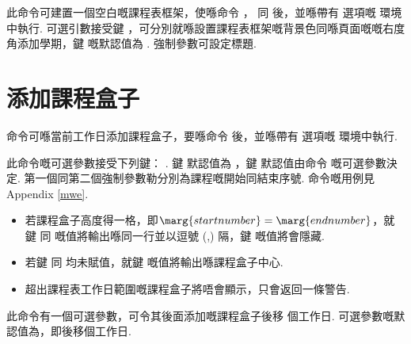 \documentclass[letterpaper]{l3doc}
\begin{document}
\begin{function}{\maketable}
  \begin{syntax}
  \end{syntax}

  此命令可建置一個空白嘅課程表框架，使喺命令 ， 同  後，並喺帶有  選項嘅  環境中執行. 可選引數接受鍵  ，可分別就喺設置課程表框架嘅背景色同喺頁面嘅嘅右度角添加學期，鍵  嘅默認值為 . 強制參數可設定標題.
\end{function}

\section{添加課程盒子}

\begin{function}{\course}
  \begin{syntax}
  \end{syntax}

   命令可喺當前工作日添加課程盒子，要喺命令  後，並喺帶有  選項嘅  環境中執行.
  
  此命令嘅可選參數接受下列鍵：    . 鍵  默認值為 ，鍵  默認值由命令  嘅可選參數決定. 第一個同第二個強制參數勒分別為課程嘅開始同結束序號. 命令嘅用例見Appendix \ref{mwe}.

  \begin{itemize}
    \item 若課程盒子高度得一格，即$\marg{start number} = \marg{end number}$，就鍵  同  嘅值將輸出喺同一行並以逗號 (,) 隔，鍵  嘅值將會隱藏.
    \item 若鍵  同  均未賦值，就鍵  嘅值將輸出喺課程盒子中心.
    \item 超出課程表工作日範圍嘅課程盒子將唔會顯示，只會返回一條警告.
  \end{itemize}
\end{function}

\begin{function}{\newday}
  \begin{syntax}
  \end{syntax}

  此命令有一個可選參數，可令其後面添加嘅課程盒子後移  個工作日. 可選參數嘅默認值為，即後移個工作日.
\end{function}
\end{document}
